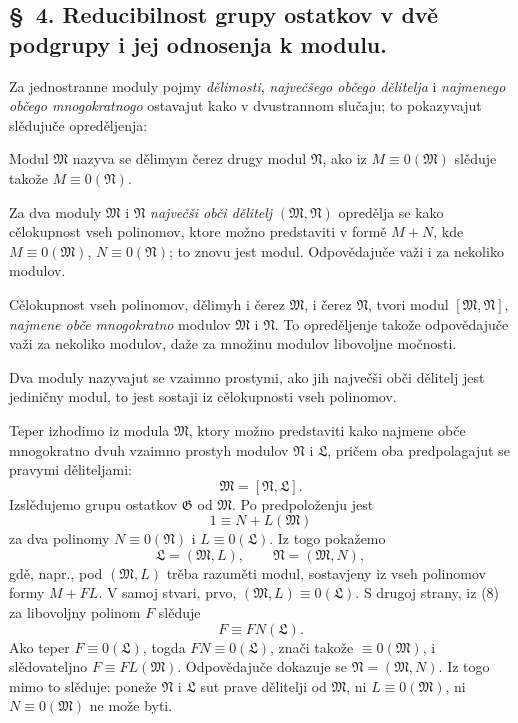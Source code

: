 \documentclass[11pt]{article}
\providecommand{\mM}{\mathfrak M}
\providecommand{\mN}{\mathfrak N}
\providecommand{\mL}{\mathfrak L}
\providecommand{\mG}{\mathfrak G}
\begin{document}

\setcounter{footnote}{10}
\subsection*{\S~4. Reducibilnost grupy ostatkov v dvě podgrupy i jej odnosenja k modulu.}

Za jednostranne moduly pojmy \textit{dělimosti}, \textit{največšego občego dělitelja} i \textit{najmenego občego mnogokratnogo} ostavajut kako v dvustrannom slučaju; to pokazyvajut slědujuče opreděljenja:

Modul \(\mM\) nazyva se dělimym čerez drugy modul \(\mN\), ako iz \(M\equiv0(\mM)\) slěduje takože \(M\equiv0(\mN)\).

Za dva moduly \(\mM\) i \(\mN\) \textit{največši obči dělitelj} \((\mM,\mN)\) opredělja se kako cělokupnost vseh polinomov, ktore možno predstaviti v formě \(M+N\), kde \(M\equiv0(\mM)\), \(N\equiv0(\mN)\); to znovu jest modul. Odpovědajuče važi i za nekoliko modulov.

Cělokupnost vseh polinomov, dělimyh i čerez \(\mM\), i čerez \(\mN\), tvori modul \([\mM,\mN]\), \textit{najmene obče mnogokratno} modulov \(\mM\) i \(\mN\). To opreděljenje takože odpovědajuče važi za nekoliko modulov, daže za množinu modulov libovoljne močnosti.

Dva moduly nazyvajut se vzaimno prostymi, ako jih največši obči dělitelj jest jediničny modul, to jest sostaji iz cělokupnosti vseh polinomov.

Teper izhodimo iz modula \(\mM\), ktory možno predstaviti kako najmene obče mnogokratno dvuh vzaimno prostyh modulov \(\mN\) i \(\mL\), pričem oba predpolagajut se pravymi děliteljami:
\begin{equation}
 \mM=[\mN,\mL].
\tag{7}
\end{equation}
Izslědujemo grupu ostatkov \(\mG\) od \(\mM\). Po predpoloženju jest
\begin{equation}
 1\equiv N+L(\mM)
\tag{8}
\end{equation}
za dva polinomy \(N\equiv0(\mN)\) i \(L\equiv0(\mL)\). Iz togo pokažemo
\begin{equation}
 \mL=(\mM,L),\qquad \mN=(\mM,N),
\tag{9}
\end{equation}
gdě, napr., pod \((\mM,L)\) trěba razuměti modul, sostavjeny iz vseh polinomov formy \(M+FL\). V samoj stvari, prvo, \((\mM,L)\equiv0(\mL)\). S drugoj strany, iz (8) za libovoljny polinom \(F\) slěduje
\begin{equation}
 F\equiv FN(\mL).
\tag{10}
\end{equation}
Ako teper \(F\equiv0(\mL)\), togda \(FN\equiv0(\mL)\), znači takože \(\equiv0(\mM)\), i slědovateljno \(F\equiv FL(\mM)\). Odpovědajuče dokazuje se \(\mN=(\mM,N)\). Iz togo mimo to slěduje: poneže \(\mN\) i \(\mL\) sut prave dělitelji od \(\mM\), ni \(L\equiv0(\mM)\), ni \(N\equiv0(\mM)\) ne može byti.
\end{document}
